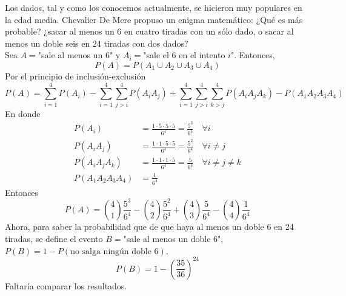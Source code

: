\item Los dados, tal y como los conocemos actualmente, se hicieron muy populares en la edad media. Chevalier De Mere propuso un enigma matemático: ¿Qué es más probable? ¿sacar al menos un 6 en cuatro tiradas con un sólo dado, o sacar al menos un doble seis en 24 tiradas con dos dados?\e\\
    Sea $A=$"sale al menos un 6" y $A_i=$"sale el 6 en el intento $i$". Entonces, \[P(A)=P(A_1\cup A_2\cup A_3\cup A_4)\]
    Por el principio de inclusión-exclusión\[P(A)=\sum\limits_{i=1}^4P(A_i)-\sum\limits_{i=1}^4\sum\limits_{j>i}^4P(A_iA_j)+\sum\limits_{i=1}^4\sum\limits_{j>i}^4\sum\limits_{k>j}^4P(A_iA_jA_k)-P(A_1A_2A_3A_4)\]
    En donde 
    \begin{align*}
        P(A_i)&=\frac{1\cdot5\cdot5\cdot5}{6^4}=\frac{5^3}{6^4}\quad\forall i\\
        P(A_iA_j)&=\frac{1\cdot1\cdot5\cdot5}{6^4}=\frac{5^2}{6^4}\quad\forall i\neq j\\
        P(A_iA_jA_k)&=\frac{1\cdot1\cdot1\cdot5}{6^4}=\frac{5}{6^4}\quad\forall i\neq j\neq k\\
        P(A_1A_2A_3A_4)&=\frac{1}{6^4}
    \end{align*}
    Entonces
    \[P(A)=\binom{4}{1}\frac{5^3}{6^4}-\binom{4}{2}\frac{5^2}{6^4}+\binom{4}{3}\frac{5}{6^4}-\binom{4}{4}\frac{1}{6^4}\]
    Ahora, para saber la probabilidad que de que haya al menos un doble 6 en 24 tiradas, se define el evento $B=$"sale al menos un doble 6", $P(B)=1-P(\text{no salga ningún doble 6})$.\[P(B)=1-\left(\frac{35}{36}\right)^{24}\]
    Faltaría comparar los resultados.